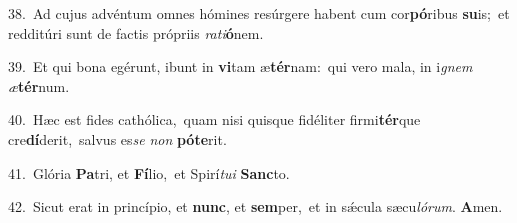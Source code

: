 {\numbfont\textcolor{\numbcolor}{38.}}~Ad cujus advéntum omnes hómines resúrgere habent cum cor\-\textbf{pó}\-ribus \textbf{su}\-is;~\star et redditúri sunt de factis própriis \textit{ra}\-\textit{ti}\textbf{ó}nem.\par
{\numbfont\textcolor{\numbcolor}{39.}}~Et qui bona egérunt, ibunt in \textbf{vi}\-tam æ\-\textbf{tér}\-nam:~\star qui vero mala, in i\textit{gnem} \textit{æ}\-\textbf{tér}num.\par
{\numbfont\textcolor{\numbcolor}{40.}}~Hæc est fides cathólica,~\dagger quam nisi quisque fidéliter firmi\-\textbf{tér}\-que cre\-\textbf{dí}\-derit,~\star salvus es\textit{se} \textit{non} \textbf{pót}\-\textbf{e}rit.\par
{\numbfont\textcolor{\numbcolor}{41.}}~Glória \textbf{Pa}\-tri, et \textbf{Fí}\-lio,~\star et Spirí\-\textit{tu}\-\textit{i} \textbf{Sanc}\-to.\par
{\numbfont\textcolor{\numbcolor}{42.}}~Sicut erat in princípio, et \textbf{nunc}\-, et \textbf{sem}\-per,~\star et in sǽcula sæcu\-\textit{ló}\-\textit{rum}. \textbf{A}\-men.\par
